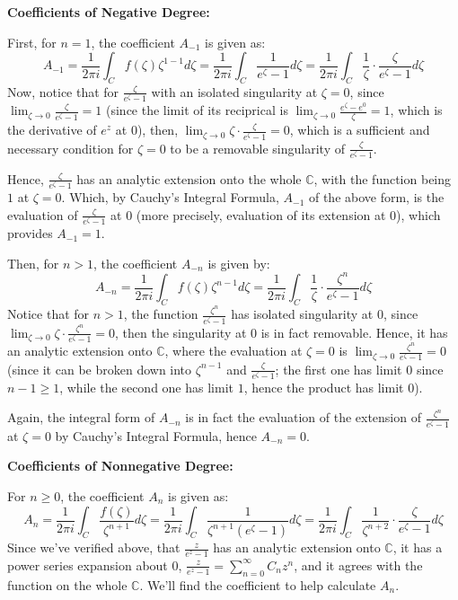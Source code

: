 \documentclass{article}
\begin{document}
\hfil

\textbf{Coefficients of Negative Degree:}

First, for $n=1$, the coefficient $A_{-1}$ is given as:
$$A_{-1}=\frac{1}{2\pi i}\int_{C}f(\zeta)\zeta^{1-1}d\zeta = \frac{1}{2\pi i}\int_{C}\frac{1}{e^{\zeta}-1}d\zeta=\frac{1}{2\pi i}\int_{C}\frac{1}{\zeta}\cdot\frac{\zeta}{e^{\zeta}-1}d\zeta$$
Now, notice that for $\frac{\zeta}{e^\zeta-1}$ with an isolated singularity at $\zeta=0$, since $\lim_{\zeta\rightarrow 0}\frac{\zeta}{e^\zeta-1}=1$ (since the limit of its reciprical is $\lim_{\zeta\rightarrow 0}\frac{e^\zeta-e^0}{\zeta}=1$, 
which is the derivative of $e^z$ at $0$),
then, $\lim_{\zeta\rightarrow 0}\zeta \cdot \frac{\zeta}{e^{\zeta}-1}=0$, which is a sufficient and necessary condition for $\zeta=0$ to be a removable singularity of $\frac{\zeta}{e^{\zeta}-1}$.

Hence, $\frac{\zeta}{e^\zeta-1}$ has an analytic extension onto the whole $\mathbb{C}$, with the function being $1$ at $\zeta=0$. Which, by Cauchy's Integral Formula, $A_{-1}$ of the above form, is the evaluation of $\frac{\zeta}{e^\zeta-1}$ at $0$ (more precisely, evaluation of its extension at $0$),
which provides $A_{-1}=1$.

\hfil

Then, for $n>1$, the coefficient $A_{-n}$ is given by:
$$A_{-n}=\frac{1}{2\pi i}\int_{C}f(\zeta)\zeta^{n-1}d\zeta=\frac{1}{2\pi i}\int_{C}\frac{1}{\zeta}\cdot \frac{\zeta^n}{e^\zeta-1}d\zeta$$
Notice that for $n>1$, the function $\frac{\zeta^n}{e^\zeta-1}$ has isolated singularity at $0$, since $\lim_{\zeta\rightarrow 0}\zeta\cdot \frac{\zeta^n}{e^\zeta-1}=0$, then the singularity at $0$ is in fact removable.
Hence, it has an analytic extension onto $\mathbb{C}$, where the evaluation at $\zeta=0$ is $\lim_{\zeta\rightarrow 0}\frac{\zeta^n}{e^\zeta-1} = 0$ (since it can be broken down into $\zeta^{n-1}$ and $\frac{\zeta}{e^\zeta-1}$; the first one has limit $0$ since $n-1\geq 1$, while the second one has limit $1$, hence the product has limit $0$).

Again, the integral form of $A_{-n}$ is in fact the evaluation of the extension of $\frac{\zeta^n}{e^\zeta-1}$ at $\zeta=0$ by Cauchy's Integral Formula, hence $A_{-n}=0$.

\hfil

\hfil

\textbf{Coefficients of Nonnegative Degree:}

For $n\geq 0$, the coefficient $A_n$ is given as:
$$A_n=\frac{1}{2\pi i}\int_{C}\frac{f(\zeta)}{\zeta^{n+1}}d\zeta=\frac{1}{2\pi i}\int_{C}\frac{1}{\zeta^{n+1}(e^\zeta-1)}d\zeta = \frac{1}{2\pi i}\int_{C}\frac{1}{\zeta^{n+2}}\cdot \frac{\zeta}{e^\zeta-1}d\zeta$$
Since we've verified above, that $\frac{z}{e^z-1}$ has an analytic extension onto $\mathbb{C}$, it has a power series expansion about $0$, $\frac{z}{e^z-1}=\sum_{n=0}^{\infty}C_nz^n$, and it agrees with the function on the whole $\mathbb{C}$.
We'll find the coefficient to help calculate $A_n$.
\end{document}
